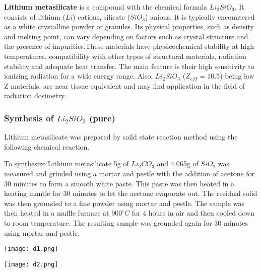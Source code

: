 \documentclass[../experiment.tex]{subfiles}
\begin{document}
    \textbf{Lithium metasilicate} is a compound with the chemical 
    formula $Li_2SiO_3$. It consists of lithium ($Li$) cations, silicate ($SiO_3$) anions.
    It is typically encountered as a white crystalline powder or granules. 
    Its physical properties, such as density and melting point, can vary depending on factors such as crystal 
    structure and the presence of impurities.These materials have physicochemical stability at high temperatures, 
    compatibility with other types of structural materials, radiation stability and adequate heat transfer. The 
    main feature is their high sensitivity to ionizing radiation for a wide energy range. Also, $Li_2SiO_3$ 
    ($Z_{eff} = 10.5$) being low Z materials, are near tissue equivalent and may find application in the field of 
    radiation dosimetry\cite{a11}. 

    \subsubsection{Synthesis of $Li_2SiO_3$ (pure)}
        Lithium metasilicate was prepared by soild state reaction method\cite{a14} using the following chemical reaction.
        \begin{center}
        \end{center}

        To synthesize Lithium metasilicate 5g of $Li_2CO_3$ and 4.065g of $SiO_2$ was measured and grinded using 
        a mortar and pestle with the addition of acetone for 30 minutes to form a smooth white paste. This paste
        was then heated in a heating mantle for 30 minutes to let the acetone evaporate out. The residual solid was 
        then grounded to a fine powder using mortar and pestle. The sample was then heated in a muffle furnace at 
        $900^{\circ}C$ for 4 hours in air and then cooled down to room temperature. The resulting sample was grounded 
        again for 30 minutes using mortar and pestle.
        \FloatBarrier\begin{multicols}{2}
            \begin{Figure}
                \centering
                \texttt{[image: d1.png]}
                \label{fig:d1}
            \end{Figure}
            \begin{Figure}
                \centering
                \texttt{[image: d2.png]}
                \label{fig:d2}
            \end{Figure}  
        \end{multicols}
\end{document}
